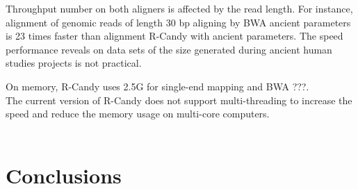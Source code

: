 \documentclass[11pt,a4paper]{report}
\begin{document}
Throughput number on both aligners is affected by the read length.
For instance, alignment of genomic reads of length 30 bp aligning
by BWA ancient parameters is 23 times faster than alignment R-Candy
with ancient parameters.
The speed performance reveals on data sets of the size generated 
during ancient human studies projects is not practical.


On memory, R-Candy uses 2.5G for single-end mapping and BWA ???.\\

The current version of R-Candy does not support multi-threading 
to increase the speed and reduce the memory usage on multi-core 
computers.\\\\









\section{Conclusions} \label{Conclusions}
\end{document}
